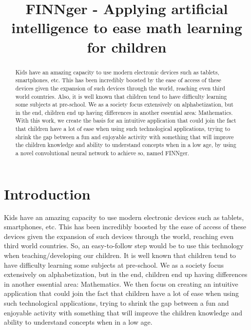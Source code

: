 \documentclass[conference]{IEEEtran}
\begin{document}
\title{FINNger - Applying artificial intelligence to ease math learning for children}

\author{
\and
{}
}

\maketitle

\begin{abstract}
    Kids have an amazing capacity to use modern electronic devices such as tablets, smartphones, etc. This has been incredibly boosted by the ease of access of these devices given the expansion of such devices through the world, reaching even third world countries. Also, it is well known that children tend to have difficulty learning some subjects at pre-school. We as a society focus extensively on alphabetization, but in the end, children end up having differences in another essential area: Mathematics. With this work, we create the basis for an intuitive application that could join the fact that children have a lot of ease when using such technological applications, trying to shrink the gap between a fun and enjoyable activity with something that will improve the children knowledge and ability to understand concepts when in a low age, by using a novel convolutional neural network to achieve so, named FINNger.
\end{abstract}

\section{Introduction}
Kids have an amazing capacity to use modern electronic devices such as tablets, smartphones, etc. This has been incredibly boosted by the ease of access of these devices given the expansion of such devices through the world, reaching even third world countries\cite{b1}. So, an easy-to-follow step would be to use this technology when teaching/developing our children.
It is well known that children tend to have difficulty learning some subjects at pre-school. We as a society focus extensively on alphabetization, but in the end, children end up having differences in another essential area: Mathematics. We then focus on creating an intuitive application that could join the fact that children have a lot of ease when using such technological applications, trying to shrink the gap between a fun and enjoyable activity with something that will improve the children knowledge and ability to understand concepts when in a low age.
\end{document}
